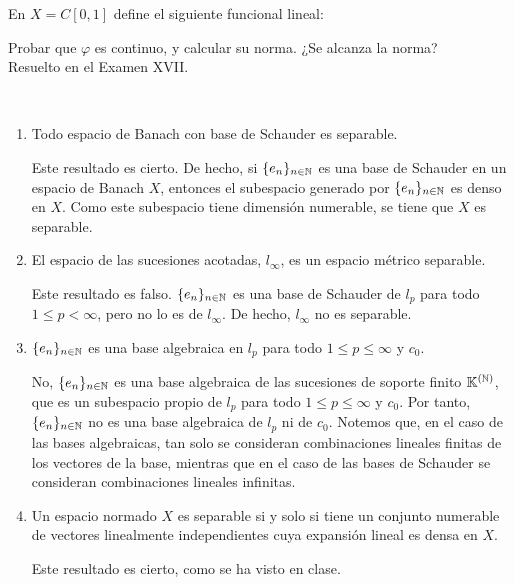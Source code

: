 \documentclass[12pt]{article}
\begin{document}
\begin{ejercicio}[2.5 puntos]
    En $X=C[0,1]$ define el siguiente funcional lineal:

    Probar que $\varphi$ es continuo, y calcular su norma. ¿Se alcanza la norma?\\

    Resuelto en el Examen XVII.
\end{ejercicio}


\begin{ejercicio}~
    \begin{enumerate}[label=(\alph*)]
        \item Todo espacio de Banach con base de Schauder es separable.
        
        Este resultado es cierto. De hecho, si $\{e_n\}_{n\in \mathbb{N}}$ es una base de Schauder en un espacio de Banach $X$, entonces el subespacio generado por $\{e_n\}_{n\in \mathbb{N}}$ es denso en $X$. Como este subespacio tiene dimensión numerable, se tiene que $X$ es separable.
        \item El espacio de las sucesiones acotadas, $l_\infty$, es un espacio métrico separable.
        
        Este resultado es falso. $\{e_n\}_{n\in \mathbb{N}}$ es una base de Schauder de $l_p$ para todo $1\leq p < \infty$, pero no lo es de $l_\infty$. De hecho, $l_\infty$ no es separable.

        \item $\{e_n\}_{n\in \mathbb{N}}$ es una base algebraica en $l_p$ para todo $1\leq p \leq \infty$ y $c_0$.
        
        No, $\{e_n\}_{n\in \mathbb{N}}$ es una base algebraica de las sucesiones de soporte finito $\mathbb{K}^{(\mathbb{N})}$, que es un subespacio propio de $l_p$ para todo $1\leq p \leq \infty$ y $c_0$. Por tanto, $\{e_n\}_{n\in \mathbb{N}}$ no es una base algebraica de $l_p$ ni de $c_0$. Notemos que, en el caso de las bases algebraicas, tan solo se consideran combinaciones lineales finitas de los vectores de la base, mientras que en el caso de las bases de Schauder se consideran combinaciones lineales infinitas.
        

        \item Un espacio normado $X$ es separable si y solo si tiene un conjunto numerable de vectores linealmente independientes cuya expansión lineal es densa en $X$.
        
        Este resultado es cierto, como se ha visto en clase.
    \end{enumerate}    
\end{ejercicio}
\end{document}
